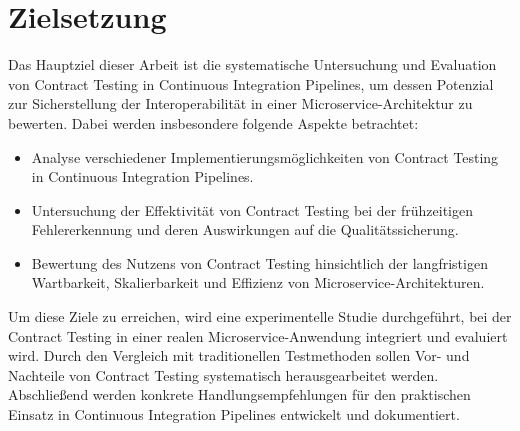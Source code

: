 \chapter{Zielsetzung}\label{ch:development}

Das Hauptziel dieser Arbeit ist die systematische Untersuchung und Evaluation von Contract Testing in Continuous Integration Pipelines, um dessen Potenzial zur Sicherstellung der Interoperabilität in einer Microservice-Architektur zu bewerten.
Dabei werden insbesondere folgende Aspekte betrachtet:

\begin{itemize}
\item Analyse verschiedener Implementierungsmöglichkeiten von Contract Testing in Continuous Integration Pipelines.
\item Untersuchung der Effektivität von Contract Testing bei der frühzeitigen Fehlererkennung und deren Auswirkungen auf die Qualitätssicherung.
\item Bewertung des Nutzens von Contract Testing hinsichtlich der langfristigen Wartbarkeit, Skalierbarkeit und Effizienz von Microservice-Architekturen.
\end{itemize}

Um diese Ziele zu erreichen, wird eine experimentelle Studie durchgeführt, bei der Contract Testing in einer realen Microservice-Anwendung integriert und evaluiert wird.
Durch den Vergleich mit traditionellen Testmethoden sollen Vor- und Nachteile von Contract Testing systematisch herausgearbeitet werden.
Abschließend werden konkrete Handlungsempfehlungen für den praktischen Einsatz in Continuous Integration Pipelines entwickelt und dokumentiert.
